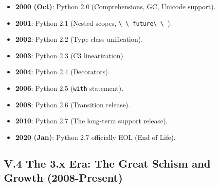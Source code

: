 \begin{itemize}
\tightlist
\item
  \textbf{2000 (Oct)}: Python 2.0 (Comprehensions, GC, Unicode support).
\item
  \textbf{2001}: Python 2.1 (Nested scopes,
  \passthrough{\lstinline!\_\_future\_\_!}).
\item
  \textbf{2002}: Python 2.2 (Type-class unification).
\item
  \textbf{2003}: Python 2.3 (C3 linearization).
\item
  \textbf{2004}: Python 2.4 (Decorators).
\item
  \textbf{2006}: Python 2.5 (\passthrough{\lstinline!with!} statement).
\item
  \textbf{2008}: Python 2.6 (Transition release).
\item
  \textbf{2010}: Python 2.7 (The long-term support release).
\item
  \textbf{2020 (Jan)}: Python 2.7 officially EOL (End of Life).
\end{itemize}

\hypertarget{v.4-the-3.x-era-the-great-schism-and-growth-2008-present}{%
\subsection{V.4 The 3.x Era: The Great Schism and Growth
(2008-Present)}\label{v.4-the-3.x-era-the-great-schism-and-growth-2008-present}}

